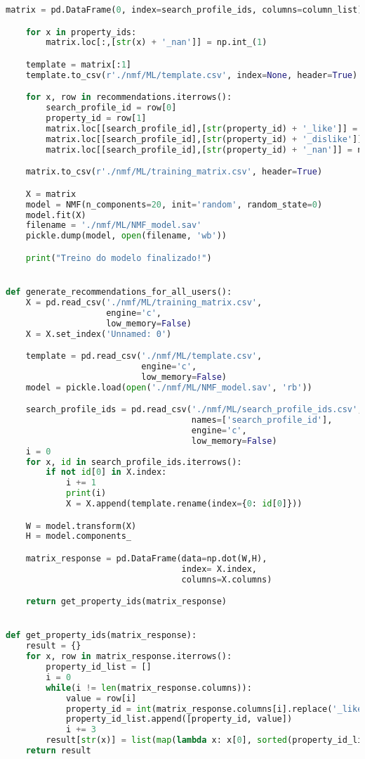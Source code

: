 \begin{apendicesenv}
\begin{lstlisting}[language=Python, caption=API - NMF Machine Learning Code]
    matrix = pd.DataFrame(0, index=search_profile_ids, columns=column_list)

    for x in property_ids:
        matrix.loc[:,[str(x) + '_nan']] = np.int_(1)

    template = matrix[:1]
    template.to_csv(r'./nmf/ML/template.csv', index=None, header=True)

    for x, row in recommendations.iterrows():
        search_profile_id = row[0]
        property_id = row[1]
        matrix.loc[[search_profile_id],[str(property_id) + '_like']] = row[2]
        matrix.loc[[search_profile_id],[str(property_id) + '_dislike']] = row[2]*(-1)+1
        matrix.loc[[search_profile_id],[str(property_id) + '_nan']] = np.int_(0)

    matrix.to_csv(r'./nmf/ML/training_matrix.csv', header=True)

    X = matrix
    model = NMF(n_components=20, init='random', random_state=0)
    model.fit(X)
    filename = './nmf/ML/NMF_model.sav'
    pickle.dump(model, open(filename, 'wb'))

    print("Treino do modelo finalizado!")


def generate_recommendations_for_all_users():
    X = pd.read_csv('./nmf/ML/training_matrix.csv',
                    engine='c',
                    low_memory=False)
    X = X.set_index('Unnamed: 0')

    template = pd.read_csv('./nmf/ML/template.csv',
                           engine='c',
                           low_memory=False)
    model = pickle.load(open('./nmf/ML/NMF_model.sav', 'rb'))

    search_profile_ids = pd.read_csv('./nmf/ML/search_profile_ids.csv',
                                     names=['search_profile_id'],
                                     engine='c',
                                     low_memory=False)
    i = 0
    for x, id in search_profile_ids.iterrows():
        if not id[0] in X.index:
            i += 1
            print(i)
            X = X.append(template.rename(index={0: id[0]}))

    W = model.transform(X)
    H = model.components_

    matrix_response = pd.DataFrame(data=np.dot(W,H),
                                   index= X.index,
                                   columns=X.columns)

    return get_property_ids(matrix_response)


def get_property_ids(matrix_response):
    result = {}
    for x, row in matrix_response.iterrows():
        property_id_list = []
        i = 0
        while(i != len(matrix_response.columns)):
            value = row[i]
            property_id = int(matrix_response.columns[i].replace('_like', ''))
            property_id_list.append([property_id, value])
            i += 3
        result[str(x)] = list(map(lambda x: x[0], sorted(property_id_list, key=itemgetter(1))[-6:-1]))
    return result
\end{lstlisting}


\end{apendicesenv}
